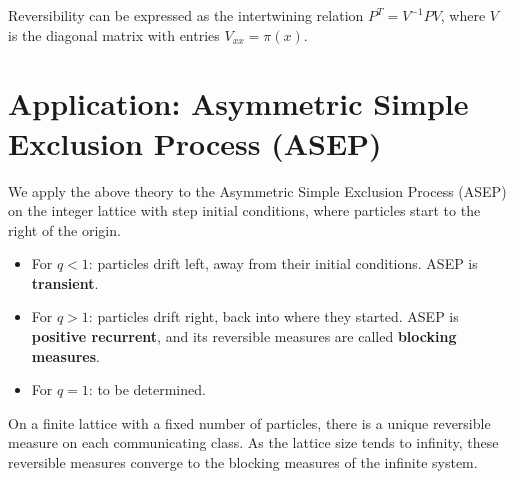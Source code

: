 \documentclass{ximera}
\begin{document}
Reversibility can be expressed as the intertwining relation $P^T = V^{-1} P V$, where $V$ is the diagonal matrix with entries $V_{xx} = \pi(x)$.

\section*{Application: Asymmetric Simple Exclusion Process (ASEP)}

We apply the above theory to the Asymmetric Simple Exclusion Process (ASEP) on the integer lattice with step initial conditions, where particles start to the right of the origin.

\begin{itemize}
\item For $q < 1$: particles drift left, away from their initial conditions. ASEP is \textbf{transient}.
\item For $q > 1$: particles drift right, back into where they started. ASEP is \textbf{positive recurrent}, and its reversible measures are called \textbf{blocking measures}.
\item For $q = 1$: to be determined.
\end{itemize}

On a finite lattice with a fixed number of particles, there is a unique reversible measure on each communicating class. As the lattice size tends to infinity, these reversible measures converge to the blocking measures of the infinite system.
\end{document}
